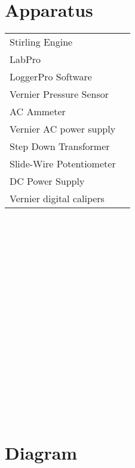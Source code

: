 \documentclass{article}
\begin{document}
\section{Apparatus}
\begin{tabular}{ll}
Stirling Engine\\
LabPro\\
LoggerPro Software\\
Vernier Pressure Sensor \\
AC Ammeter\\
Vernier AC power supply\\
Step Down Transformer\\
Slide-Wire Potentiometer\\
DC Power Supply\\
Vernier digital calipers\\
\end{tabular}
\\\\\\\\\\\\\\\\\\\\\\\\\\\\\\\\\\
\section{Diagram}

\ 

\ 

\ 

\ 

\ 

\ 

\ 

\ 

\ 

\ 

\ 

\ 

\ 

\ 

\ 

\ 

\ 

\ 
\end{document}

